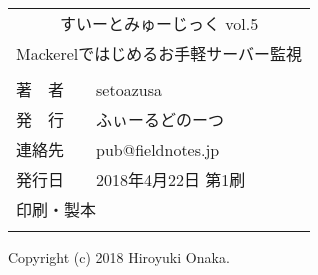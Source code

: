 \newpage
\pagestyle{fancy}
\lhead[]{}
\chead[]{}
\rhead[]{}


\begin{center}
    \vspace*{95mm} %

\begin{tabular}{l}
\multicolumn{1}{c}{\Large{すいーとみゅーじっく vol.5}}\\[3mm] %
\multicolumn{1}{c}{Mackerelではじめるお手軽サーバー監視}\\[3mm] %
\hline
\\[-3mm]
\hspace{2mm}\large{著　者　　}\hspace{5mm}setoazusa\\[0mm] 
\hspace{2mm}\large{発　行　　}\hspace{5mm}ふぃーるどのーつ\\[0mm] 
\hspace{2mm}\large{連絡先　　}\hspace{5mm}pub@fieldnotes.jp\\[0mm] 
\hspace{2mm}\large{発行日　　}\hspace{5mm}2018年4月22日 第1刷\\[0mm]
\hspace{2mm}\large{印刷・製本}\hspace{5mm}{日光企画}\\[0mm]
\\\hline
\end{tabular}
\end{center}
\begin{center}
Copyright (c) 2018 Hiroyuki Onaka.
\end{center}


